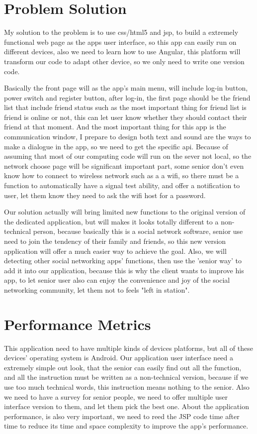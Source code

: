 \documentclass[draftclsnofoot,onecolumn,letterpaper,10pt,cmcc]{IEEEtran}
\begin{document}
\section{Problem Solution}
My solution to the problem is to use css/html5 and jsp, to build a extremely functional web page as the apps user interface, so this app can easily run on different devices, also we need to learn how to use Angular, this platform will transform our code to adapt other device, so we only need to write one version code. 
\par Basically the front page will as the app's main menu, will include log-in button, power switch and register button, after log-in, the first page should be the friend list that include friend status such as the most important thing for friend list is friend is online or not, this can let user know whether they should contact their friend at that moment. And the most important thing for this app is the communication window, I prepare to design both text and sound are the ways to make a dialogue in the app, so we need to get the specific api. Because of assuming that most of our computing code will run on the sever not local, so the network choose page will be significant important part, some senior don't even know how to connect to wireless network such as a a wifi, so there must be a function to automatically have a signal test ability, and offer a notification to user, let them know they need to ask the wifi host for a password.
\par Our solution actually will bring limited new functions to the original version of the dedicated application, but will makes it looks totally different to a non-technical person, because basically this is a social network software, senior use need to join the tendency of their family and friends, so this new version application will offer a much easier way to achieve the goal. Also, we will detecting other social networking apps' functions, then use the 'senior way' to add it into our application, because this is why the client wants to improve his app, to let senior user also can enjoy the convenience and joy of the social networking community, let them not to feels  "left in station".
\section{Performance Metrics}
This application need to have multiple kinds of devices platforms, but all of these devices' operating system is Android. Our application user interface need a extremely simple out look, that the senior can easily find out all the function, and all the instruction must be written as a non-technical version, because if we use too much technical words, this instruction means nothing to the senior. Also we need to have a survey for senior people, we need to offer multiple user interface version to them, and let them pick the best one. About the application performance, is also very important, we need to reed the JSP code time after time to reduce its time and space complexity to improve the app's performance.
\end{document}
